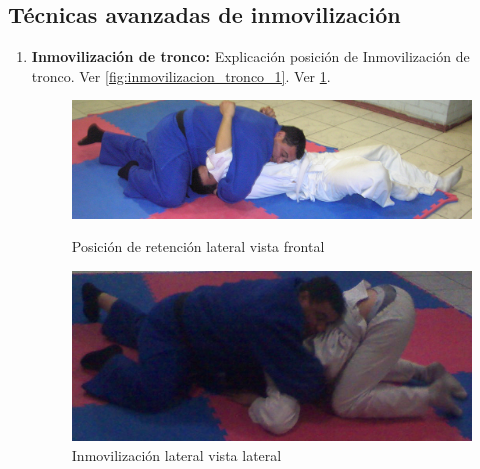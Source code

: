 \subsection{Técnicas avanzadas de inmovilización}

\begin{enumerate}

	\item \textbf{Inmovilización de tronco:} Explicación posición de Inmovilización de tronco. Ver \ref{fig:inmovilizacion_tronco_1}. Ver \ref{fig:inmovilizacion_tronco_2}.

	\begin{figure}[h]
		\centering
		\begin{minipage}{0.45\textwidth}
			\includegraphics[width=\linewidth]{images/Lucha_de_Piso/14_inmovilizacion_pecho.png}
			\caption{Posición de retención lateral vista frontal}
			\label{fig:inmovilizacion_tronco_1}
		\end{minipage}
		\hfill
		\begin{minipage}{0.45\textwidth}
			\includegraphics[width=\linewidth]{images/Lucha_de_Piso/15_inmovilizacion_pecho.png}
			\caption{Inmovilización lateral vista lateral}
			\label{fig:inmovilizacion_tronco_2}
		\end{minipage}
		\hfill
	\end{figure}



\end{enumerate}
